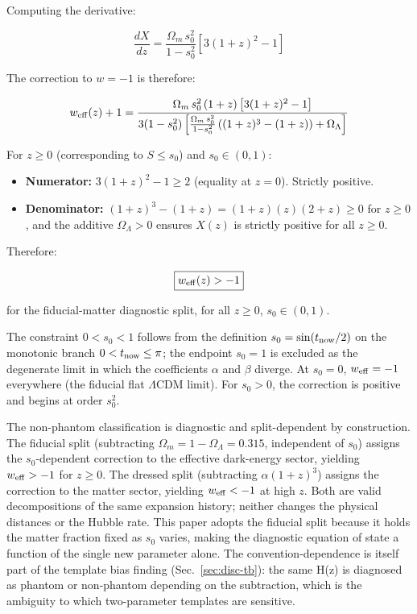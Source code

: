 \documentclass[
  aps,
  prd,
  onecolumn,         %
  nofootinbib,
  longbibliography
]{revtex4-2}
\providecommand{\tightlist}{%
  \setlength{\itemsep}{0pt}\setlength{\parskip}{0pt}}
\begin{document}
Computing the derivative:

\[\frac{dX}{dz} = \frac{\Omega_m\, s_0^2}{1 - s_0^2}\left[3(1+z)^2 - 1\right]\]

The correction to $w = -1$ is therefore:

\[w_{\rm eff}(z) + 1 = \frac{\Omega_m\, s_0^2\,(1+z)\left[3(1+z)^2 - 1\right]}{3(1 - s_0^2)\left[\frac{\Omega_m\, s_0^2}{1 - s_0^2}\left((1+z)^3 - (1+z)\right) + \Omega_\Lambda\right]}\]

\pagebreak

For $z \geq 0$ (corresponding to $S \leq s_0$) and $s_0 \in (0, 1)$:

\begin{itemize}
\tightlist
\item
  \textbf{Numerator:} $3(1+z)^2 - 1 \geq 2$ (equality at $z = 0$). Strictly
  positive.
\item
  \textbf{Denominator:} $(1+z)^3 - (1+z) = (1+z)(z)(2+z) \geq 0$ for $z \geq 0$,
  and the additive $\Omega_\Lambda > 0$ ensures $X(z)$ is strictly
  positive for all $z \geq 0$.
\end{itemize}

Therefore:

\[\boxed{w_{\rm eff}(z) > -1}\]

for the fiducial-matter diagnostic split, for all \(z \geq 0\),
\(s_0 \in (0, 1)\).

The constraint $0 < s_0 < 1$ follows from the
definition $s_0 = \sin(t_{\rm now}/2)$ on the monotonic branch $0 < t_{\rm now} \leq \pi$; the endpoint $s_0 = 1$ is excluded as the
degenerate limit in which the coefficients $\alpha$ and $\beta$ diverge. At
$s_0 = 0$, $w_{\rm eff} = -1$ everywhere (the fiducial flat $\Lambda$CDM limit). For
$s_0 > 0$, the correction is positive and begins at order $s_0^2$.

The non-phantom classification is diagnostic and split-dependent by
construction. The fiducial split (subtracting $\Omega_m = 1 - \Omega_\Lambda = 0.315$, independent of $s_0$) assigns the $s_0$-dependent correction to
the effective dark-energy sector, yielding $w_{\rm eff} > -1$ for $z \geq 0$.
The dressed split (subtracting $\alpha(1+z)^3$) assigns the
correction to the matter sector, yielding $w_{\rm eff} < -1$ at high
$z$. Both are valid decompositions of the same expansion history; neither
changes the physical distances or the Hubble rate. This paper adopts
the fiducial split because it holds the matter fraction fixed as $s_0$
varies, making the diagnostic equation of state a function of the
single new parameter alone. The convention-dependence is itself part of
the template bias finding (Sec.~\ref{sec:disc-tb}): the same H(z) is
diagnosed as phantom or non-phantom depending on the subtraction, which
is the ambiguity to which two-parameter templates are sensitive.
\end{document}
